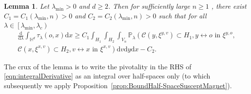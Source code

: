 \documentclass[10pt,a4paper,dvipsnames]{article}
\newtheorem{lemma}[theorem]{Lemma}
\theoremstyle{definition}
\theoremstyle{remark}
\newcommand{\pla}{\mathbb P_\lambda}
\newcommand{\HypDim}{{\mathbb{H}^d}}
\newcommand{\dd}{\mathrm{d}} %
\newcommand{\C}{\mathscr {C}}
\newcommand{\conn}[3]{#1 \longleftrightarrow #2\textrm { in } #3}
\newcommand{\tlam}{\tau_\lambda}
\newcommand{\orig}{o}
\numberwithin{equation}{section}
\begin{document}
\begin{lemma}\label{lem:SteppingStones}
    Let $\lambda_{\min}>0$ and $d\geq 2$. Then for sufficiently large $n\geq 1$ , there exist $C_1=C_1(\lambda_{\min},n)>0$ and $C_2=C_2(\lambda_{\min},n)>0$ such that for all $\lambda\in\left[\lambda_{\min},\lambda_c\right)$
    \begin{multline}
        \frac{\dd}{\dd \lambda}\int_{\HypDim}\tlam\left(\orig,x\right)\dd x \geq C_1\int_{H_1}\int_{H_2}\int_{V_n} \pla\left(\C\left(y,\xi^{y,v}\right)\subset H_1, \conn{y}{\orig}{\xi^{y,\orig}},\right.\\\left. \C\left(x,\xi^{x,v}\right)\subset  H_2,\conn{v}{x}{\xi^{x,v}}\right)\dd v \dd y \dd x - C_2.
    \end{multline}
\end{lemma}
The crux of the lemma is to write the pivotality in the RHS of \eqref{eqn:integralDerivative} as an integral over half-spaces only (to which subsequently we apply Proposition~\ref{prop:BoundHalf-SpaceSusceptMagnet}). 
\end{document}
